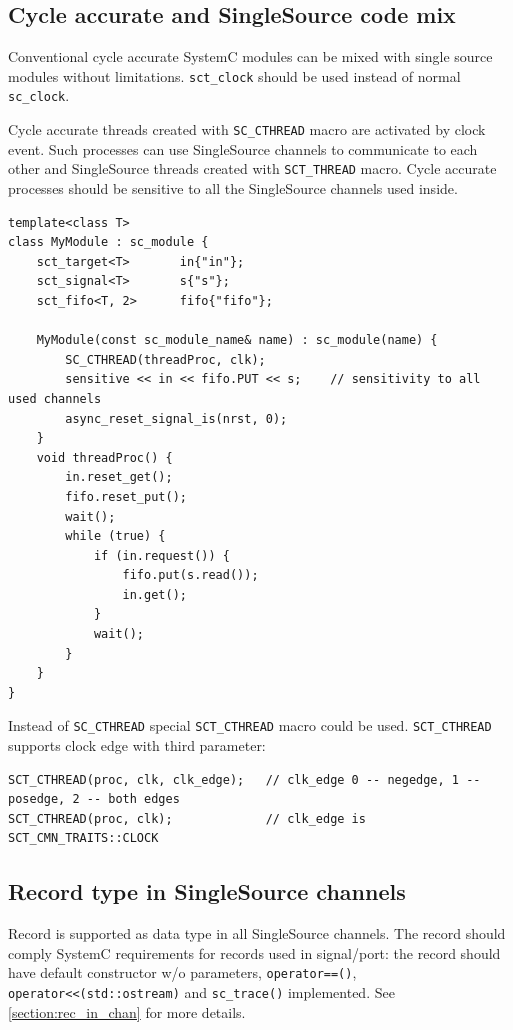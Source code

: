 \subsection{Cycle accurate and SingleSource code mix}

Conventional cycle accurate SystemC modules can be mixed with single source modules without limitations. {\tt sct\_clock} should be used instead of normal {\tt sc\_clock}.

Cycle accurate threads created with {\tt SC\_CTHREAD} macro are activated by clock event. Such processes can use SingleSource channels to communicate to each other and SingleSource threads created with {\tt SCT\_THREAD} macro. Cycle accurate processes should be sensitive to all the SingleSource channels used inside.

\begin{lstlisting}[style=mycpp]
template<class T>
class MyModule : sc_module {
    sct_target<T>       in{"in"};
    sct_signal<T>       s{"s"};
    sct_fifo<T, 2>      fifo{"fifo"};

    MyModule(const sc_module_name& name) : sc_module(name) {
        SC_CTHREAD(threadProc, clk);
        sensitive << in << fifo.PUT << s;    // sensitivity to all used channels
        async_reset_signal_is(nrst, 0);
    }
    void threadProc() {
        in.reset_get();
        fifo.reset_put();
        wait();
        while (true) {
            if (in.request()) {
                fifo.put(s.read()); 
                in.get();
            }
            wait();
        }
    }
}
\end{lstlisting}

Instead of {\tt SC\_CTHREAD} special {\tt SCT\_CTHREAD} macro could be used. {\tt SCT\_CTHREAD} supports clock edge with third parameter:

\begin{lstlisting}[style=mycpp]
SCT_CTHREAD(proc, clk, clk_edge);   // clk_edge 0 -- negedge, 1 -- posedge, 2 -- both edges
SCT_CTHREAD(proc, clk);             // clk_edge is SCT_CMN_TRAITS::CLOCK
\end{lstlisting}

\subsection{Record type in SingleSource channels}

Record is supported as data type in all SingleSource channels. The record should comply SystemC requirements for records used in signal/port: the record should have default constructor w/o parameters, {\tt operator==()}, {\tt operator<<(std::ostream)} and {\tt sc\_trace()} implemented.
See \ref{section:rec_in_chan} for more details.

